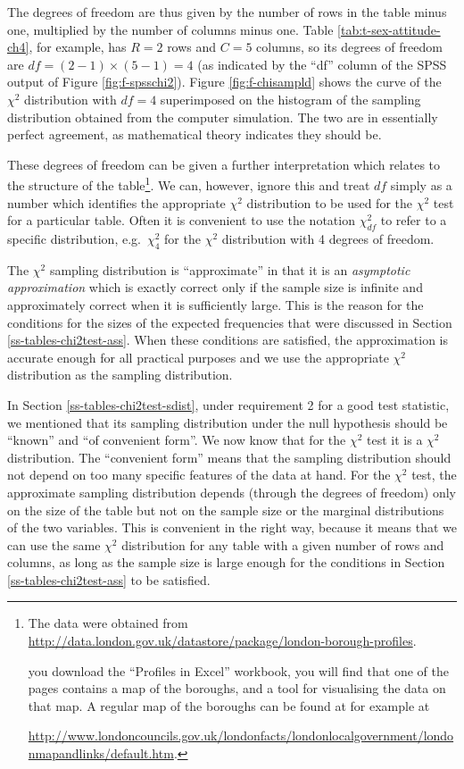 \documentclass[11pt,a4paper,openany]{book}
\let\rmarkdownfootnote\footnote%
\def\footnote{\protect\rmarkdownfootnote}
\begin{document}
The degrees of freedom are thus given by the number of rows in the table
minus one, multiplied by the number of columns minus one. Table
\ref{tab:t-sex-attitude-ch4}, for example, has \(R=2\) rows and \(C=5\)
columns, so its degrees of freedom are \(df=(2-1)\times(5-1)=4\) (as
indicated by the ``df'' column of the SPSS output of Figure
\ref{fig:f-spsschi2}). Figure \ref{fig:f-chisampld} shows the curve of
the \(\chi^{2}\) distribution with \(df=4\) superimposed on the
histogram of the sampling distribution obtained from the computer
simulation. The two are in essentially perfect agreement, as
mathematical theory indicates they should be.

These degrees of freedom can be given a further interpretation which
relates to the structure of the table\footnote{The data were obtained
  from
  \url{http://data.london.gov.uk/datastore/package/london-borough-profiles}.

  \noindentIf you download the ``Profiles in Excel'' workbook, you will
  find that one of the pages contains a map of the boroughs, and a tool
  for visualising the data on that map. A regular map of the boroughs
  can be found at for example at

  \url{http://www.londoncouncils.gov.uk/londonfacts/londonlocalgovernment/londonmapandlinks/default.htm}.}.
We can, however, ignore this and treat \(df\) simply as a number which
identifies the appropriate \(\chi^{2}\) distribution to be used for the
\(\chi^{2}\) test for a particular table. Often it is convenient to use
the notation \(\chi^{2}_{df}\) to refer to a specific distribution,
e.g.~\(\chi^{2}_{4}\) for the \(\chi^{2}\) distribution with 4 degrees
of freedom.

The \(\chi^{2}\) sampling distribution is ``approximate'' in that it is
an \emph{asymptotic approximation} which is exactly correct only if the
sample size is infinite and approximately correct when it is
sufficiently large. This is the reason for the conditions for the sizes
of the expected frequencies that were discussed in Section
\ref{ss-tables-chi2test-ass}. When these conditions are satisfied, the
approximation is accurate enough for all practical purposes and we use
the appropriate \(\chi^{2}\) distribution as the sampling distribution.

In Section \ref{ss-tables-chi2test-sdist}, under requirement 2 for a
good test statistic, we mentioned that its sampling distribution under
the null hypothesis should be ``known'' and ``of convenient form''. We
now know that for the \(\chi^{2}\) test it is a \(\chi^{2}\)
distribution. The ``convenient form'' means that the sampling
distribution should not depend on too many specific features of the data
at hand. For the \(\chi^{2}\) test, the approximate sampling
distribution depends (through the degrees of freedom) only on the size
of the table but not on the sample size or the marginal distributions of
the two variables. This is convenient in the right way, because it means
that we can use the same \(\chi^{2}\) distribution for any table with a
given number of rows and columns, as long as the sample size is large
enough for the conditions in Section \ref{ss-tables-chi2test-ass} to be
satisfied.
\end{document}
